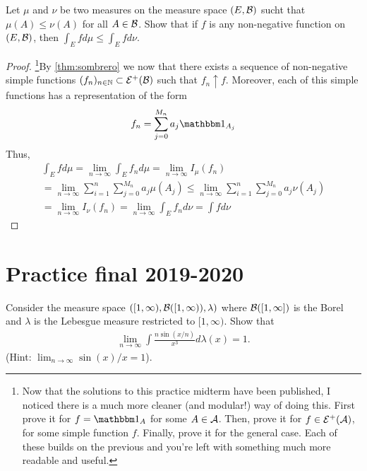 \begin{ex}
	Let $\mu$ and $\nu$ be two measures on the measure space $(E, \mathcal{B})$ sucht that $\mu(A) \leq \nu(A)$ for all $A \in \mathcal{B}$. Show that if $f$ is any non-negative function on $(E, \mathcal{B})$, then $\int_E f d\mu \leq \int_E f d\nu$.
\end{ex}

\begin{proof}
	\footnote{Now that the solutions to this practice midterm have been published, I noticed there is a much more cleaner (and modular!) way of doing this. First prove it for $f = \ind_A$ for some $A\in \mathcal{A}$. Then, prove it for $f \in \mathcal{E}^+(\mathcal{A})$, for some simple function $f$. Finally, prove it for the general case. Each of these builds on the previous and you're left with something much more readable and useful.}By \autoref{thm:sombrero} we now that there exists a sequence of non-negative simple functions $(f_n)_{n\in\mathbb{N}} \subset \mathcal{E}^+(\mathcal{B})$ such that $f_n \uparrow f$. Moreover, each of this simple functions has a representation of the form
	\begin{align*}
		f_n = \sum_{j=0}^{M_n} a_j \ind_{A_j}
	\end{align*}
	Thus,
	\begin{multline*}
		\int_E fd\mu
		= \lim_{n \to \infty} \int_E f_n d\mu
		= \lim_{n \to \infty} I_\mu(f_n) \\
		= \lim_{n \to \infty} \sum_{i = 1}^n \sum_{j=0}^{M_n} a_j \mu(A_j)
		\leq \lim_{n \to \infty} \sum_{i = 1}^n \sum_{j = 0}^{M_n} a_j \nu(A_j) \\
		= \lim_{n \to \infty} I_\nu(f_n) 
		= \lim_{n \to \infty} \int_E f_n d\nu
		= \int fd\nu
	\end{multline*}
\end{proof}

\section{Practice final 2019-2020}

\begin{ex}
	Consider the measure space $([1, \infty), \mathcal{B}([1, \infty)), \lambda)$ where $\mathcal{B}([1,\infty])$ is the Borel \siga and $\lambda$ is the Lebesgue measure restricted to $[1, \infty)$. Show that
	\begin{align*}
		\lim_{n\to\infty} \int \frac{n \sin (x/n)}{x^3}d\lambda(x) = 1.
	\end{align*}
	(Hint: $\lim_{n\to\infty} \sin(x)/x = 1$).
\end{ex}

